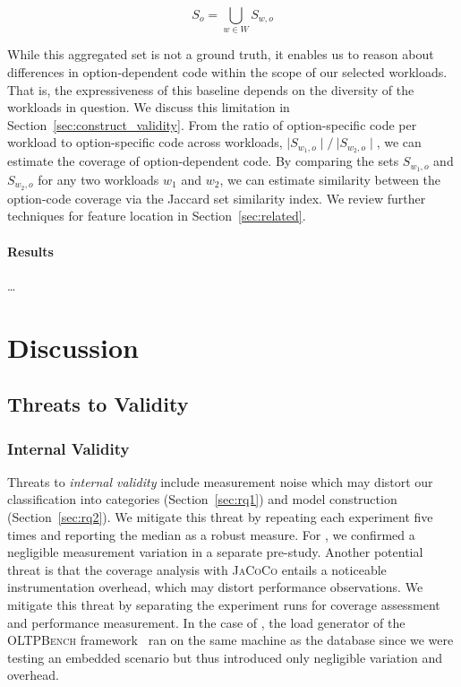 {\begin{equation}
	S_{o} = \bigcup_{w \in W} S_{w, o}
\end{equation}

While this aggregated set is not a ground truth, it enables us to reason about differences in option-dependent code within the scope of our selected workloads. That is, the expressiveness of this baseline depends on the diversity of the workloads in question. We discuss this limitation in Section~\ref{sec:construct_validity}. From the ratio of option-specific code per workload to option-specific code across workloads, $\mid S_{w_1, o}\mid/~{\mid S_{w_2, o}\mid}$, we can estimate the coverage of option-dependent code. By comparing the sets $S_{w_1, o}$ and $S_{w_2, o}$ for any two workloads $w_1$ and $w_2$, we can estimate similarity between the option-code coverage via the Jaccard set similarity index. We review further techniques for feature location in Section~\ref{sec:related}.

\paragraph*{Results}
{\color{red}\ldots}


\section{Discussion}\label{sec:discussion}

\subsection{Threats to Validity}
\subsubsection{Internal Validity}\label{sec:internal_validity}
Threats to \emph{internal validity} include measurement noise which may distort our classification into categories (Section~\ref{sec:rq1}) and model construction (Section~\ref{sec:rq2}). We mitigate this threat by repeating each experiment five times and reporting the median as a robust measure. For \htwo, we confirmed a negligible measurement variation in a separate pre-study.
Another potential threat is that the coverage analysis with \mbox{\textsc{JaCoCo}} entails a noticeable instrumentation overhead, which may distort performance observations. We mitigate this threat by separating the experiment runs for coverage assessment and performance measurement. In the case of \htwo, the load generator of the \textsc{OLTPBench} framework~\cite{difallah_oltp_2013} ran on the same machine as the database since we were testing an embedded scenario but thus introduced only negligible variation and overhead.

}
